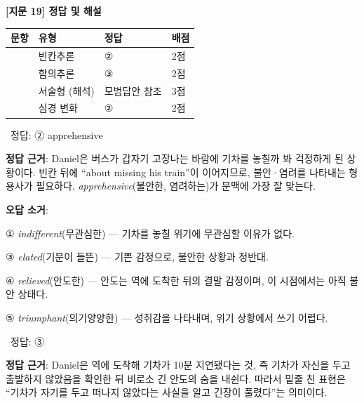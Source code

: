 \documentclass[11pt,a4paper]{article}
\newcommand{\qno}[1]{\par\vspace{10pt}\noindent{\sffamily\bfseries #1.}\ }
\newcommand{\instr}[1]{{\sffamily #1}\par\vspace{3pt}}
\begin{document}
\begin{center}
{\fontsize{15}{17}\selectfont\sffamily\bfseries [지문 19] 정답 및 해설}
\end{center}
\vspace{8pt}

\begin{center}
\begin{tabular}{>{\centering\arraybackslash}p{2cm}
                >{\centering\arraybackslash}p{3.5cm}
                >{\centering\arraybackslash}p{2cm}
                >{\centering\arraybackslash}p{2cm}}
\toprule
\bfseries 문항 & \bfseries 유형 & \bfseries 정답 & \bfseries 배점 \\
\midrule
1 & 빈칸추론 & ② & 2점 \\
2 & 함의추론 & ③ & 2점 \\
3 & 서술형 (해석) & 모범답안 참조 & 3점 \\
4 & 심경 변화 & ② & 2점 \\
\bottomrule
\end{tabular}
\end{center}

\vspace{12pt}

\qno{1}\instr{[빈칸추론] 정답: ②  apprehensive}

\noindent\textbf{정답 근거}: Daniel은 버스가 갑자기 고장나는 바람에 기차를 놓칠까 봐 걱정하게 된 상황이다.
빈칸 뒤에 ``about missing his train''이 이어지므로, 불안·염려를 나타내는 형용사가 필요하다.
\textit{apprehensive}(불안한, 염려하는)가 문맥에 가장 잘 맞는다.

\vspace{4pt}
\noindent\textbf{오답 소거}:
\begin{choices}
\item ① \textit{indifferent}(무관심한) — 기차를 놓칠 위기에 무관심할 이유가 없다.
\item ③ \textit{elated}(기분이 들뜬) — 기쁜 감정으로, 불안한 상황과 정반대.
\item ④ \textit{relieved}(안도한) — 안도는 역에 도착한 뒤의 결말 감정이며, 이 시점에서는 아직 불안 상태다.
\item ⑤ \textit{triumphant}(의기양양한) — 성취감을 나타내며, 위기 상황에서 쓰기 어렵다.
\end{choices}

\vspace{10pt}

\qno{2}\instr{[함의추론] 정답: ③}

\noindent\textbf{정답 근거}: Daniel은 역에 도착해 기차가 10분 지연됐다는 것, 즉 기차가 자신을 두고 출발하지 않았음을 확인한 뒤 비로소 긴 안도의 숨을 내쉰다.
따라서 밑줄 친 표현은 ``기차가 자기를 두고 떠나지 않았다는 사실을 알고 긴장이 풀렸다''는 의미이다.
\end{document}
